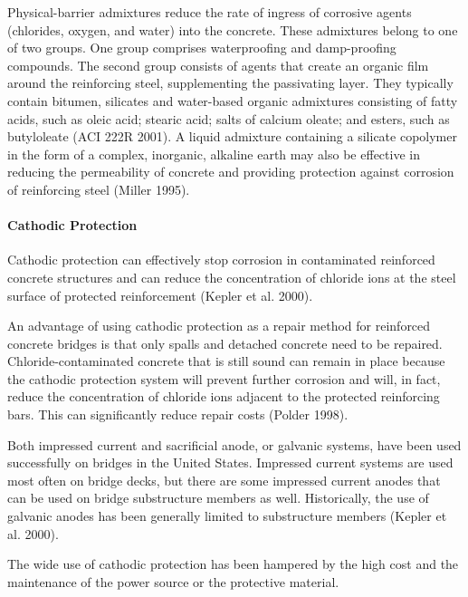 Physical-barrier admixtures reduce the rate of ingress of corrosive agents (chlorides, oxygen, and water) into the
concrete. These admixtures belong to one of two groups. One group comprises waterproofing and damp-proofing
compounds. The second group consists of agents that create an organic film around the reinforcing steel,
supplementing the passivating layer. They typically contain bitumen, silicates and water-based organic admixtures
consisting of fatty acids, such as oleic acid; stearic acid; salts of calcium oleate; and esters, such as butyloleate (ACI
222R 2001). A liquid admixture containing a silicate copolymer in the form of a complex, inorganic, alkaline earth
may also be effective in reducing the permeability of concrete and providing protection against corrosion of
reinforcing steel (Miller 1995).



\paragraph{Cathodic Protection}
Cathodic protection can effectively stop corrosion in contaminated reinforced concrete structures and can reduce
the concentration of chloride ions at the steel surface of protected reinforcement (Kepler et al. 2000).

An advantage of using cathodic protection as a repair method for reinforced concrete bridges is that only spalls
and detached concrete need to be repaired. Chloride-contaminated concrete that is still sound can remain in place
because the cathodic protection system will prevent further corrosion and will, in fact, reduce the concentration of
chloride ions adjacent to the protected reinforcing bars. This can significantly reduce repair costs (Polder 1998).

Both impressed current and sacrificial anode, or galvanic systems, have been used successfully on bridges in the
United States. Impressed current systems are used most often on bridge decks, but there are some impressed current
anodes that can be used on bridge substructure members as well. Historically, the use of galvanic anodes has been
generally limited to substructure members (Kepler et al. 2000).

The wide use of cathodic protection has been hampered by the high cost and the maintenance of the power
source or the protective material.

